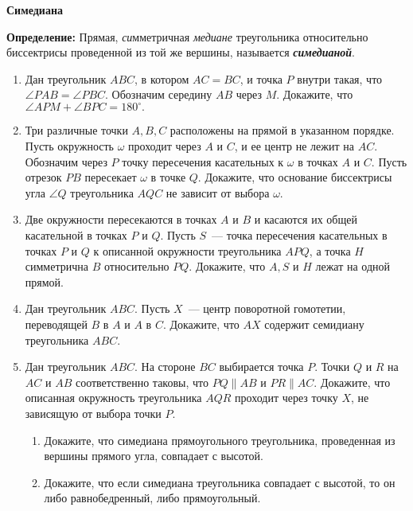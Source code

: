 \documentclass{article}
\begin{document}
\large



\begin{center}
\textbf{Симедиана}
\end{center}

\textbf{Определение:} Прямая, \textit{си}мметричная \textit{медиане} треугольника относительно {биссектрисы} проведенной из той же вершины, называется \textit{\textbf{симедианой}}.


\begin{enumerate}[label*=\protect\fbox{\arabic{enumi}}]

\item Дан треугольник $ ABC $, в котором $ AC = BC $, и точка $ P $ внутри такая, что $ \angle PAB = \angle PBC$. Обозначим середину $ AB $ через $ M $. Докажите, что $ \angle APM+\angle BPC=180^\circ.$

\item Три различные точки $ A, B, C  $ расположены на прямой в указанном порядке. Пусть окружность $\omega$ проходит через $ A $ и $ C $, и ее центр не лежит на $ AC $. Обозначим через $ P $ точку пересечения касательных к $\omega$ в точках $ A $ и $ C $. Пусть отрезок $ PB $ пересекает $\omega$ в точке $ Q $. Докажите, что основание биссектрисы угла $ \angle Q $ треугольника $ AQC $ не зависит от выбора $\omega$.

\item Две окружности пересекаются в точках $ A $ и $ B $ и касаются их общей касательной в точках $ P $ и $ Q $. Пусть $ S $~--- точка пересечения касательных в точках $ P $ и $ Q $ к описанной окружности треугольника $ AP Q $, а точка $ H $ симметрична $ B $ относительно $ P Q $. Докажите, что $ A, S $ и $ H $ лежат на одной прямой.

\item  Дан треугольник $ ABC $. Пусть $ X $~--- центр поворотной гомотетии, переводящей $ B $ в $ A $ и $ A $ в $ C $. Докажите, что $ AX $ содержит семидиану треугольника $ ABC $.

\item Дан треугольник $ ABC $. На стороне $ BC $ выбирается точка $ P $. Точки $ Q $ и $ R $ на $ AC $ и $ AB $ соответственно таковы, что $ PQ \parallel AB$  и  $PR \parallel AC$. Докажите, что описанная окружность треугольника $ AQR $ проходит через точку $ X $, не зависящую от выбора точки $ P $.

\begin{enumerate}
	\item Докажите, что симедиана прямоугольного треугольника, проведенная из вершины прямого угла, совпадает с высотой.
	\item Докажите, что если симедиана треугольника совпадает с высотой, то он либо равнобедренный, либо прямоугольный.
\end{enumerate}



\end{enumerate}
\end{document}
